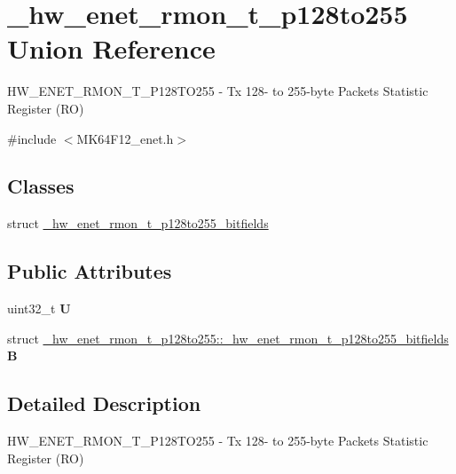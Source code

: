 \hypertarget{union__hw__enet__rmon__t__p128to255}{}\section{\+\_\+hw\+\_\+enet\+\_\+rmon\+\_\+t\+\_\+p128to255 Union Reference}
\label{union__hw__enet__rmon__t__p128to255}


H\+W\+\_\+\+E\+N\+E\+T\+\_\+\+R\+M\+O\+N\+\_\+\+T\+\_\+\+P128\+T\+O255 -\/ Tx 128-\/ to 255-\/byte Packets Statistic Register (RO)  




{\ttfamily \#include $<$M\+K64\+F12\+\_\+enet.\+h$>$}

\subsection*{Classes}
\begin{DoxyCompactItemize}
\item 
struct \hyperlink{struct__hw__enet__rmon__t__p128to255_1_1__hw__enet__rmon__t__p128to255__bitfields}{\+\_\+hw\+\_\+enet\+\_\+rmon\+\_\+t\+\_\+p128to255\+\_\+bitfields}
\end{DoxyCompactItemize}
\subsection*{Public Attributes}
\begin{DoxyCompactItemize}
\item 
uint32\+\_\+t {\bfseries U}\hypertarget{union__hw__enet__rmon__t__p128to255_a378075604dac14b168162caf86792029}{}\label{union__hw__enet__rmon__t__p128to255_a378075604dac14b168162caf86792029}

\item 
struct \hyperlink{struct__hw__enet__rmon__t__p128to255_1_1__hw__enet__rmon__t__p128to255__bitfields}{\+\_\+hw\+\_\+enet\+\_\+rmon\+\_\+t\+\_\+p128to255\+::\+\_\+hw\+\_\+enet\+\_\+rmon\+\_\+t\+\_\+p128to255\+\_\+bitfields} {\bfseries B}\hypertarget{union__hw__enet__rmon__t__p128to255_a4996612f51a8889c737681e04fd95abf}{}\label{union__hw__enet__rmon__t__p128to255_a4996612f51a8889c737681e04fd95abf}

\end{DoxyCompactItemize}


\subsection{Detailed Description}
H\+W\+\_\+\+E\+N\+E\+T\+\_\+\+R\+M\+O\+N\+\_\+\+T\+\_\+\+P128\+T\+O255 -\/ Tx 128-\/ to 255-\/byte Packets Statistic Register (RO) 

